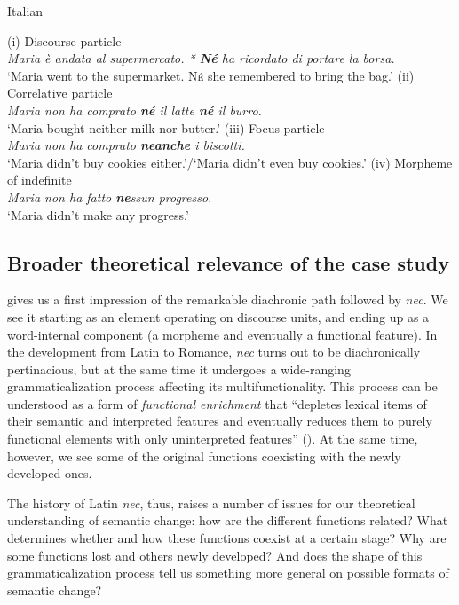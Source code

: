 \documentclass[output=paper]{langsci/langscibook}
\begin{document}
{\begin{exe}
\ex \label{overviewita} Italian
\begin{xlist}
\ex \label{polswitchfirstex} (i) Discourse particle\\
{\itshape Maria \`e andata al supermercato. * {\textbf{N\'e}} ha ricordato di portare la borsa.}\\
`Maria went to the supermarket. {\textsc{N\'e}} she remembered to bring the bag.'
\ex (ii) Correlative particle\\
{\itshape Maria non ha comprato {\textbf{n\'e}} il latte {\textbf{n\'e}} il burro.}\\
`Maria bought neither milk nor butter.'
\ex (iii) Focus particle\\
{\itshape Maria non ha comprato {\textbf{neanche}} i biscotti.}\\
`Maria didn't buy cookies either.'\slash`Maria didn't even buy cookies.'
\ex (iv) Morpheme of indefinite\\
{\itshape Maria non ha fatto {\textbf{ne}}ssun progresso.}\\
`Maria didn't make any progress.'
\end{xlist}
\end{exe}}

\subsection{Broader theoretical relevance of the case study} \label{theoreticalrelevance}

 gives us a first impression of the remarkable diachronic path followed by {\emph{nec}}. We see it starting as an element operating on discourse units, and ending up as a word-internal component (a morpheme and eventually a functional feature). In the development from Latin to Romance, {\emph{nec}} turns out to be diachronically pertinacious, but at the same time it undergoes a wide-ranging grammaticalization process affecting its multifunctionality. This process can be understood as a form of {\emph{functional enrichment}} that ``depletes lexical items of their semantic and interpreted features and eventually reduces them to purely functional elements with only uninterpreted features'' (\citealt[73]{Kiparsky15}). At the same time, however, we see some of the original functions coexisting with the newly developed ones.

The history of Latin {\emph{nec}}, thus, raises a number of issues for our theoretical understanding of semantic change: how are the different functions related? What determines whether and how these functions coexist at a certain stage? Why are some functions lost and others newly developed? And does the shape of this grammaticalization process tell us something more general on possible formats of semantic change?
\end{document}
